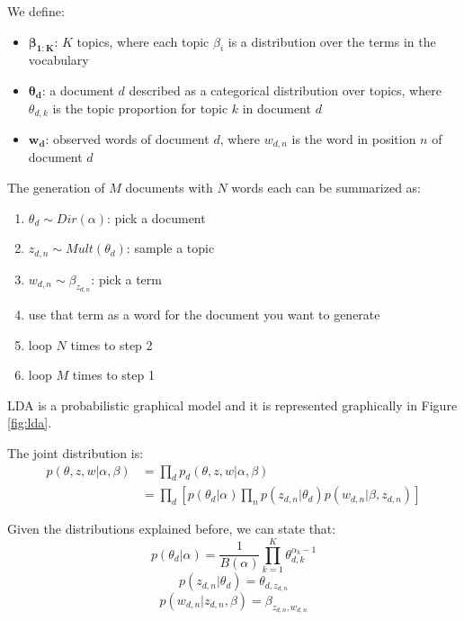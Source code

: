 We define:
\begin{itemize}
    \item $\boldsymbol{\beta_{1:K}}$: $K$ topics, where each topic $\beta_i$ is a distribution over the terms in the vocabulary
    \item $\boldsymbol{\theta_d}$: a document $d$ described as a categorical distribution over topics, where $\theta_{d,k}$ is the topic proportion for topic $k$ in document $d$
    \item $\boldsymbol{w_{d}}$: observed words of document $d$, where $w_{d,n}$ is the word in position $n$ of document $d$
\end{itemize}

The generation of $M$ documents with $N$ words each can be summarized as:
\begin{enumerate}
    \item $\theta_d \sim Dir(\alpha)$: pick a document
    \item $z_{d,n} \sim \mathit{Mult}(\theta_d)$: sample a topic
    \item $w_{d,n} \sim \beta_{z_{d,n}}$: pick a term
    \item use that term as a word for the document you want to generate
    \item loop $N$ times to step 2
    \item loop $M$ times to step 1
\end{enumerate}

LDA is a probabilistic graphical model and it is represented graphically in Figure \ref{fig:lda}.

The joint distribution is:
\begin{equation*}
    \begin{split}
        p(\theta, z, w | \alpha, \beta) & = \prod_d p_d(\theta, z, w | \alpha, \beta) \\
        & = \prod_d [p(\theta_d | \alpha) \prod_n p(z_{d,n} | \theta_d) p(w_{d, n} | \beta, z_{d,n})]
    \end{split}
\end{equation*}

Given the distributions explained before, we can state that:
\[ p(\theta_d | \alpha) = \frac{1}{B(\alpha)} \prod_{k=1}^K \theta_{d,k}^{\alpha_k - 1} \]
\[ p(z_{d,n} | \theta_d) = \theta_{d, z_{d,n}} \]
\[ p(w_{d,n} | z_{d,n}, \beta) = \beta_{z_{d,n},w_{d,n}} \]

